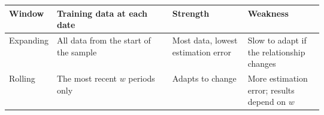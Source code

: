 \begin{center}
\small
\begin{tabularx}{0.9\linewidth}{@{}>{\raggedright\arraybackslash}p{0.13\linewidth}>{\raggedright\arraybackslash}X>{\raggedright\arraybackslash}p{0.24\linewidth}>{\raggedright\arraybackslash}p{0.24\linewidth}@{}}
\toprule
Window & Training data at each date & Strength & Weakness \\
\midrule
Expanding & All data from the start of the sample & Most data, lowest estimation error & Slow to adapt if the relationship changes \\
Rolling & The most recent $w$ periods only & Adapts to change & More estimation error; results depend on $w$ \\
\bottomrule
\end{tabularx}
\end{center}


